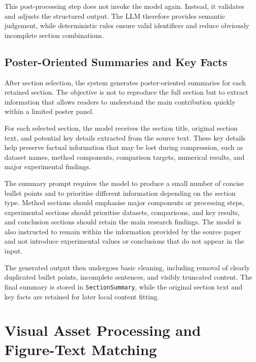 \documentclass[12pt,oneside]{report}
\begin{document}
\vspace{1em}

This post-processing step does not invoke the model again. Instead, it validates and adjusts the structured output. The LLM therefore provides semantic judgement, while deterministic rules ensure valid identifiers and reduce obviously incomplete section combinations.

\subsection{Poster-Oriented Summaries and Key Facts}

After section selection, the system generates poster-oriented summaries for each retained section. The objective is not to reproduce the full section but to extract information that allows readers to understand the main contribution quickly within a limited poster panel.

\vspace{1em}

For each selected section, the model receives the section title, original section text, and potential key details extracted from the source text. These key details help preserve factual information that may be lost during compression, such as dataset names, method components, comparison targets, numerical results, and major experimental findings.

\vspace{1em}

The summary prompt requires the model to produce a small number of concise bullet points and to prioritise different information depending on the section type. Method sections should emphasise major components or processing steps, experimental sections should prioritise datasets, comparisons, and key results, and conclusion sections should retain the main research findings. The model is also instructed to remain within the information provided by the source paper and not introduce experimental values or conclusions that do not appear in the input.

\vspace{1em}

The generated output then undergoes basic cleaning, including removal of clearly duplicated bullet points, incomplete sentences, and visibly truncated content. The final summary is stored in \texttt{SectionSummary}, while the original section text and key facts are retained for later local content fitting.

\section{Visual Asset Processing and Figure-Text Matching}
\end{document}
